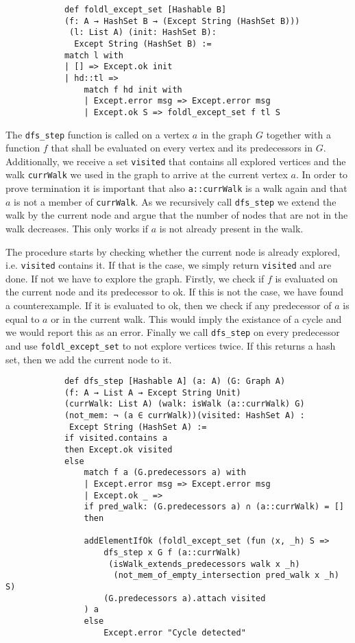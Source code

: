 \documentclass{article}
\begin{document}
        \begin{lstlisting}
            def foldl_except_set [Hashable B] 
            (f: A → HashSet B → (Except String (HashSet B)))
             (l: List A) (init: HashSet B):
              Except String (HashSet B) :=
            match l with
            | [] => Except.ok init
            | hd::tl =>
                match f hd init with
                | Except.error msg => Except.error msg
                | Except.ok S => foldl_except_set f tl S

        \end{lstlisting}

        The \texttt{dfs\_step} function is called on a vertex $a$ in the graph $G$ together with a function $f$ that shall be evaluated on every vertex and its predecessors in $G$. Additionally, we receive a set \texttt{visited} that contains all explored vertices and the walk \texttt{currWalk} we used in the graph to arrive at the current vertex $a$. In order to prove termination it is important that also \texttt{a::currWalk} is a walk again and that $a$ is not a member of \texttt{currWalk}. As we recursively call \texttt{dfs\_step} we extend the walk by the current node and argue that the number of nodes that are not in the walk decreases. This only works if $a$ is not already present in the walk.

        The procedure starts by checking whether the current node is already explored, i.e. \texttt{visited} contains it. If that is the case, we simply return \texttt{visited} and are done. If not we have to explore the graph. Firstly, we check if $f$ is evaluated on the current node and its predecessor to ok. If this is not the case, we have found a counterexample. If it is evaluated to ok, then we check if any predecessor of $a$ is equal to $a$ or in the current walk. This would imply the existance of a cycle and we would report this as an error. 
        Finally we call \texttt{dfs\_step} on every predecessor and use \texttt{foldl\_except\_set} to not explore vertices twice. If this returns a hash set, then we add the current node to it. 


        \begin{lstlisting}
            def dfs_step [Hashable A] (a: A) (G: Graph A) 
            (f: A → List A → Except String Unit) 
            (currWalk: List A) (walk: isWalk (a::currWalk) G) 
            (not_mem: ¬ (a ∈ currWalk))(visited: HashSet A) :
             Except String (HashSet A) :=
            if visited.contains a
            then Except.ok visited
            else
                match f a (G.predecessors a) with
                | Except.error msg => Except.error msg
                | Except.ok _ =>
                if pred_walk: (G.predecessors a) ∩ (a::currWalk) = []
                then

                addElementIfOk (foldl_except_set (fun ⟨x, _h⟩ S =>
                    dfs_step x G f (a::currWalk) 
                     (isWalk_extends_predecessors walk x _h) 
                      (not_mem_of_empty_intersection pred_walk x _h) S) 
                    (G.predecessors a).attach visited
                ) a
                else
                    Except.error "Cycle detected"
        \end{lstlisting}
\end{document}
